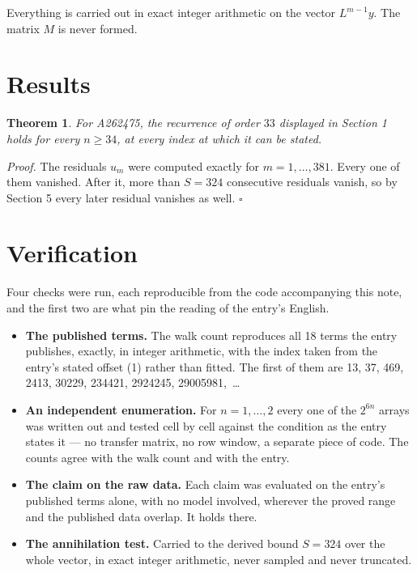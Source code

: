 \documentclass[11pt]{article}
\newtheorem{theorem}{Theorem}
\theoremstyle{definition}
\begin{document}
Everything is carried out in exact integer arithmetic on the vector $L^{m-1}y$. The matrix $M$ is never formed.

\section{Results}

\begin{theorem} For A262475, the recurrence of order $33$ displayed in Section 1 holds for every $n \ge 34$, at every index at which it can be stated.\end{theorem}

{\itshape Proof.} The residuals $u_m$ were computed exactly for $m = 1,\dots,381$. Every one of them vanished. After it, more than $S = 324$ consecutive residuals vanish, so by Section 5 every later residual vanishes as well. $\square$

\section{Verification}

Four checks were run, each reproducible from the code accompanying this note, and the first two are what pin the reading of the entry's English.

\begin{itemize}

\item {\bfseries The published terms.} The walk count reproduces all 18 terms the entry publishes, exactly, in integer arithmetic, with the index taken from the entry's stated offset (1) rather than fitted. The first of them are 13, 37, 469, 2413, 30229, 234421, 2924245, 29005981,~\dots

\item {\bfseries An independent enumeration.} For $n = 1,\dots,2$ every one of the $2^{6n}$ arrays was written out and tested cell by cell against the condition as the entry states it --- no transfer matrix, no row window, a separate piece of code. The counts agree with the walk count and with the entry.

\item {\bfseries The claim on the raw data.} Each claim was evaluated on the entry's published terms alone, with no model involved, wherever the proved range and the published data overlap. It holds there.

\item {\bfseries The annihilation test.} Carried to the derived bound $S = 324$ over the whole vector, in exact integer arithmetic, never sampled and never truncated.

\end{itemize}
\end{document}
